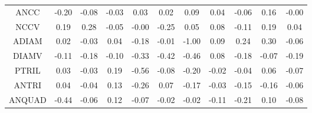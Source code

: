 \begin{longtable}{ | c || c | c | c | c | c | c | c | c | c || c |}
ANCC &  \cellcolor[HTML]{FFF7F7} -0.20 &  \cellcolor[HTML]{FFFFFF} -0.08 &  \cellcolor[HTML]{FFFFFF} -0.03 &  \cellcolor[HTML]{FFFFFF} 0.03 &  \cellcolor[HTML]{FFFFFF} 0.02 &  \cellcolor[HTML]{FFFFFF} 0.09 &  \cellcolor[HTML]{FFFFFF} 0.04 &  \cellcolor[HTML]{FFFFFF} -0.06 &  \cellcolor[HTML]{FFFFFF} 0.16 &  \cellcolor[HTML]{FFFFFF} -0.00 \\
NCCV &  \cellcolor[HTML]{F7F7FF} 0.19 &  \cellcolor[HTML]{F7F7FF} 0.28 &  \cellcolor[HTML]{FFFFFF} -0.05 &  \cellcolor[HTML]{FFFFFF} -0.00 &  \cellcolor[HTML]{FFF7F7} -0.25 &  \cellcolor[HTML]{FFFFFF} 0.05 &  \cellcolor[HTML]{FFFFFF} 0.08 &  \cellcolor[HTML]{FFFFFF} -0.11 &  \cellcolor[HTML]{F7F7FF} 0.19 &  \cellcolor[HTML]{FFFFFF} 0.04 \\
ADIAM &  \cellcolor[HTML]{FFFFFF} 0.02 &  \cellcolor[HTML]{FFFFFF} -0.03 &  \cellcolor[HTML]{FFFFFF} 0.04 &  \cellcolor[HTML]{FFF7F7} -0.18 &  \cellcolor[HTML]{FFFFFF} -0.01 &  \cellcolor[HTML]{FFE7E7} -1.00 &  \cellcolor[HTML]{FFFFFF} 0.09 &  \cellcolor[HTML]{F7F7FF} 0.24 &  \cellcolor[HTML]{F7F7FF} 0.30 &  \cellcolor[HTML]{FFFFFF} -0.06 \\
DIAMV &  \cellcolor[HTML]{FFFFFF} -0.11 &  \cellcolor[HTML]{FFF7F7} -0.18 &  \cellcolor[HTML]{FFFFFF} -0.10 &  \cellcolor[HTML]{FFF7F7} -0.33 &  \cellcolor[HTML]{FFF7F7} -0.42 &  \cellcolor[HTML]{FFF7F7} -0.46 &  \cellcolor[HTML]{FFFFFF} 0.08 &  \cellcolor[HTML]{FFF7F7} -0.18 &  \cellcolor[HTML]{FFFFFF} -0.07 &  \cellcolor[HTML]{FFF7F7} -0.19 \\
PTRIL &  \cellcolor[HTML]{FFFFFF} 0.03 &  \cellcolor[HTML]{FFFFFF} -0.03 &  \cellcolor[HTML]{F7F7FF} 0.19 &  \cellcolor[HTML]{FFEFEF} -0.56 &  \cellcolor[HTML]{FFFFFF} -0.08 &  \cellcolor[HTML]{FFF7F7} -0.20 &  \cellcolor[HTML]{FFFFFF} -0.02 &  \cellcolor[HTML]{FFFFFF} -0.04 &  \cellcolor[HTML]{FFFFFF} 0.06 &  \cellcolor[HTML]{FFFFFF} -0.07 \\
ANTRI &  \cellcolor[HTML]{FFFFFF} 0.04 &  \cellcolor[HTML]{FFFFFF} -0.04 &  \cellcolor[HTML]{FFFFFF} 0.13 &  \cellcolor[HTML]{FFF7F7} -0.26 &  \cellcolor[HTML]{FFFFFF} 0.07 &  \cellcolor[HTML]{FFF7F7} -0.17 &  \cellcolor[HTML]{FFFFFF} -0.03 &  \cellcolor[HTML]{FFFFFF} -0.15 &  \cellcolor[HTML]{FFF7F7} -0.16 &  \cellcolor[HTML]{FFFFFF} -0.06 \\
ANQUAD &  \cellcolor[HTML]{FFF7F7} -0.44 &  \cellcolor[HTML]{FFFFFF} -0.06 &  \cellcolor[HTML]{FFFFFF} 0.12 &  \cellcolor[HTML]{FFFFFF} -0.07 &  \cellcolor[HTML]{FFFFFF} -0.02 &  \cellcolor[HTML]{FFFFFF} -0.02 &  \cellcolor[HTML]{FFFFFF} -0.11 &  \cellcolor[HTML]{FFF7F7} -0.21 &  \cellcolor[HTML]{FFFFFF} 0.10 &  \cellcolor[HTML]{FFFFFF} -0.08 \\

\end{longtable}

